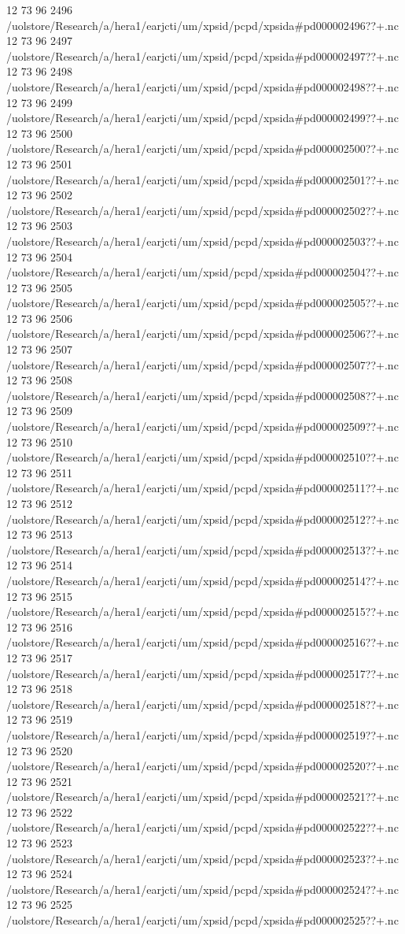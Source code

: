 12 73 96
2496
/uolstore/Research/a/hera1/earjcti/um/xpsid/pcpd/xpsida#pd000002496??+.nc
12 73 96
2497
/uolstore/Research/a/hera1/earjcti/um/xpsid/pcpd/xpsida#pd000002497??+.nc
12 73 96
2498
/uolstore/Research/a/hera1/earjcti/um/xpsid/pcpd/xpsida#pd000002498??+.nc
12 73 96
2499
/uolstore/Research/a/hera1/earjcti/um/xpsid/pcpd/xpsida#pd000002499??+.nc
12 73 96
2500
/uolstore/Research/a/hera1/earjcti/um/xpsid/pcpd/xpsida#pd000002500??+.nc
12 73 96
2501
/uolstore/Research/a/hera1/earjcti/um/xpsid/pcpd/xpsida#pd000002501??+.nc
12 73 96
2502
/uolstore/Research/a/hera1/earjcti/um/xpsid/pcpd/xpsida#pd000002502??+.nc
12 73 96
2503
/uolstore/Research/a/hera1/earjcti/um/xpsid/pcpd/xpsida#pd000002503??+.nc
12 73 96
2504
/uolstore/Research/a/hera1/earjcti/um/xpsid/pcpd/xpsida#pd000002504??+.nc
12 73 96
2505
/uolstore/Research/a/hera1/earjcti/um/xpsid/pcpd/xpsida#pd000002505??+.nc
12 73 96
2506
/uolstore/Research/a/hera1/earjcti/um/xpsid/pcpd/xpsida#pd000002506??+.nc
12 73 96
2507
/uolstore/Research/a/hera1/earjcti/um/xpsid/pcpd/xpsida#pd000002507??+.nc
12 73 96
2508
/uolstore/Research/a/hera1/earjcti/um/xpsid/pcpd/xpsida#pd000002508??+.nc
12 73 96
2509
/uolstore/Research/a/hera1/earjcti/um/xpsid/pcpd/xpsida#pd000002509??+.nc
12 73 96
2510
/uolstore/Research/a/hera1/earjcti/um/xpsid/pcpd/xpsida#pd000002510??+.nc
12 73 96
2511
/uolstore/Research/a/hera1/earjcti/um/xpsid/pcpd/xpsida#pd000002511??+.nc
12 73 96
2512
/uolstore/Research/a/hera1/earjcti/um/xpsid/pcpd/xpsida#pd000002512??+.nc
12 73 96
2513
/uolstore/Research/a/hera1/earjcti/um/xpsid/pcpd/xpsida#pd000002513??+.nc
12 73 96
2514
/uolstore/Research/a/hera1/earjcti/um/xpsid/pcpd/xpsida#pd000002514??+.nc
12 73 96
2515
/uolstore/Research/a/hera1/earjcti/um/xpsid/pcpd/xpsida#pd000002515??+.nc
12 73 96
2516
/uolstore/Research/a/hera1/earjcti/um/xpsid/pcpd/xpsida#pd000002516??+.nc
12 73 96
2517
/uolstore/Research/a/hera1/earjcti/um/xpsid/pcpd/xpsida#pd000002517??+.nc
12 73 96
2518
/uolstore/Research/a/hera1/earjcti/um/xpsid/pcpd/xpsida#pd000002518??+.nc
12 73 96
2519
/uolstore/Research/a/hera1/earjcti/um/xpsid/pcpd/xpsida#pd000002519??+.nc
12 73 96
2520
/uolstore/Research/a/hera1/earjcti/um/xpsid/pcpd/xpsida#pd000002520??+.nc
12 73 96
2521
/uolstore/Research/a/hera1/earjcti/um/xpsid/pcpd/xpsida#pd000002521??+.nc
12 73 96
2522
/uolstore/Research/a/hera1/earjcti/um/xpsid/pcpd/xpsida#pd000002522??+.nc
12 73 96
2523
/uolstore/Research/a/hera1/earjcti/um/xpsid/pcpd/xpsida#pd000002523??+.nc
12 73 96
2524
/uolstore/Research/a/hera1/earjcti/um/xpsid/pcpd/xpsida#pd000002524??+.nc
12 73 96
2525
/uolstore/Research/a/hera1/earjcti/um/xpsid/pcpd/xpsida#pd000002525??+.nc
